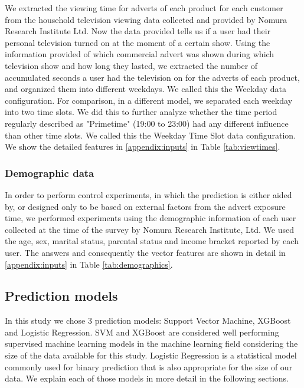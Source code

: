 \documentclass[review]{elsarticle}
\begin{document}
We extracted the viewing time for adverts of each product for each customer from the household television viewing data collected and provided by Nomura Research Institute Ltd. Now the data provided tells us if a user had their personal television turned on at the moment of a certain show. Using the information provided of which commercial advert was shown during which television show and how long they lasted, we extracted the number of accumulated seconds a user had the television on for the adverts of each product, and organized them into different weekdays. We called this the Weekday data configuration. For comparison, in a different model, we separated each weekday into two time slots. We did this to further analyze whether the time period regularly described as "Primetime" (19:00 to 23:00) had any different influence than other time slots. We called this the Weekday Time Slot data configuration. We show the detailed features in \ref{appendix:inputs} in Table \ref{tab:viewtimes}.

\subsubsection{Demographic data}
\label{demographics}

In order to perform control experiments, in which the prediction is either aided by, or designed only to be based on external factors from the advert exposure time, we performed experiments using the demographic information of each user collected at the time of the survey by Nomura Research Institute, Ltd. We used the age, sex, marital status, parental status and income bracket reported by each user. The answers and consequently the vector features are shown in detail in \ref{appendix:inputs} in Table \ref{tab:demographics}.

\subsection{Prediction models}
\label{pred_models}

In this study we chose 3 prediction models: Support Vector Machine, XGBoost and Logistic Regression. SVM and XGBoost are considered well performing supervised machine learning models in the machine learning field considering the size of the data available for this study. Logistic Regression is a statistical model commonly used for binary prediction that is also appropriate for the size of our data. We explain each of those models in more detail in the following sections.
\end{document}
